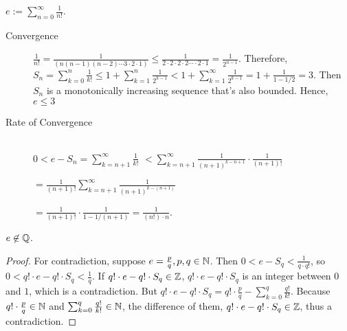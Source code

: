 \begin{definition}[e]
	$e:= \sum_{n=0}^{\infty}{\frac{1}{n!}}$.
	\begin{remark}
		\begin{description}
			\item[Convergence]
			      $\frac{1}{n!}=\frac{1}{(n(n-1)(n-2)\cdots 3\cdot 2 \cdot 1)}\le \frac{1}{2\cdot 2\cdot 2 \cdot 2 \cdots \cdot 2 \cdot 1}=\frac{1}{2^{n-1}}$. Therefore, $S_n= \sum_{k=0}^{n}{\frac{1}{k!}}\le 1+\sum_{k=1}^{n}{\frac{1}{2^{k-1}}}<1+\sum_{k=1}^{\infty }{\frac{1}{2^{k-1}}}=1+\frac{1}{1- 1/2}=3$. Then $S_n$ is a monotonically increasing sequence that's also bounded. Hence, $e \le 3$
			\item[Rate of Convergence]\hfill\\
			      $0<e-S_n=\sum_{k=n+1}^{\infty}{\frac{1}{k!}}$
			      $< \sum_{k=n+1}^{\infty}{\frac{1}{(n+1)^{k-n+1}}\cdot  \frac{1}{(n+1)!}}$

			      $= \frac{1}{(n+1)!} \sum_{k=n+1}^{\infty} \frac{1}{(n+1)^{k-(n+1)}}$

			      $=\frac{1}{(n+1)!} \cdot \frac{1}{1-1/(n+1)}=\frac{1}{(n!)\cdot n}$.

		\end{description}
	\end{remark}
\end{definition}

\begin{theorem}
	\label{thm:3.32}
	$e \not\in \mathbb{Q}$.
	\begin{proof}
		For contradiction, suppose $e=\frac{p}{q}, p,q \in \mathbb{N}$.
		Then  $0<e-S_q<\frac{1}{q\cdot q!}$, so $0<q!\cdot e - q! \cdot S_q< \frac{1}{q}$. If $q! \cdot e - q! \cdot S_q \in \mathbb{Z}$, $q! \cdot e - q! \cdot S_q$ is an integer between $0$ and $1$, which is a contradiction.
		But $q! \cdot e - q! \cdot S_q=q! \cdot \frac{p}{q} - \sum_{k=0}^{q}{\frac{q!}{k!}}$. Because $q! \cdot \frac{p}{q} \in \mathbb{N}$ and $\sum_{k=0}^{q}{\frac{q!}{k!}} \in \mathbb{N}$, the difference of them, $q! \cdot e - q! \cdot S_q \in \mathbb{Z}$, thus a contradiction.
	\end{proof}
\end{theorem}

